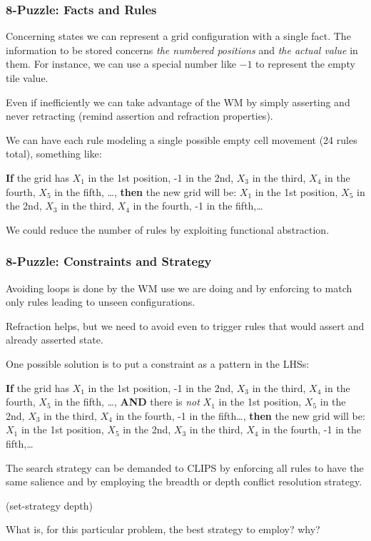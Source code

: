 \documentclass[xcolor={usenames,dvipsnames,svgnames}, compress]{beamer}
\begin{document}
\begin{frame}[fragile]
  \frametitle{8-Puzzle: Facts and Rules}
  Concerning states we can represent a grid configuration with a
  single fact. The information to be stored concerns \emph{the numbered
  positions} and \emph{the actual value} in them. For instance, we can use a special number
  like $-1$ to represent the empty tile value.\par\bigskip

  Even if inefficiently we can take advantage of the WM
  by simply asserting and never retracting (remind assertion and
  refraction properties).\par\bigskip

  We can have each rule modeling a single possible empty cell movement
  (24 rules total), something like:\par\bigskip

  \textbf{If} the grid has $X_1$ in the 1st position, -1 in the 2nd, $X_3$ in the
  third, $X_4$ in the fourth, $X_5$ in the fifth, \dots, \textbf{then} the new
  grid will be:  $X_1$ in the 1st position, $X_5$ in the 2nd, $X_3$ in the
  third, $X_4$ in the fourth, -1 in the fifth,\dots\par\bigskip

  We could reduce the number of rules by exploiting functional abstraction.\par

  
  
  
\end{frame}

\begin{frame}[fragile]
  \frametitle{8-Puzzle: Constraints and Strategy}
  Avoiding loops is done by the WM use we are doing and by enforcing
  to match only rules leading to unseen configurations.\par
  Refraction helps, but we need to avoid even to trigger rules that
  would assert and already asserted state.\par

  One possible solution is to put a constraint as a pattern in the LHSs:\par\bigskip

  \textbf{If} the grid has $X_1$ in the 1st position, -1 in the 2nd, $X_3$ in the
  third, $X_4$ in the fourth, $X_5$ in the fifth, \dots, \textbf{AND}
  there is \emph{not} $X_1$ in the 1st position, $X_5$ in the 2nd, $X_3$ in the
  third, $X_4$ in the fourth, -1 in the fifth\dots, \textbf{then} the new
  grid will be:  $X_1$ in the 1st position, $X_5$ in the 2nd, $X_3$ in the
  third, $X_4$ in the fourth, -1 in the fifth,\dots\par\bigskip

  The search strategy can be demanded to CLIPS by enforcing all rules
  to have the same salience and by employing the \textsf{breadth} or
  \textsf{depth} conflict resolution strategy.
  \begin{clips-code}[numers=none]
    (set-strategy depth)
  \end{clips-code}
  What is, for this particular problem, the best strategy to employ? why?\par

\end{frame}
\end{document}
